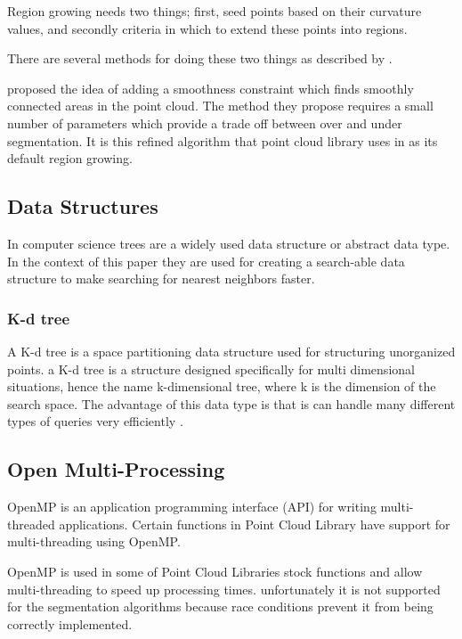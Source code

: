 			Region growing needs two things; first, seed points based on their curvature values, and secondly criteria in which to extend these points into regions.
			
			There are several methods for doing these two things as described by \cite{hoover_experimental_1996}.		
			
			\cite{rabbani_segmentation_2006} proposed the idea of adding a smoothness constraint which finds smoothly connected areas in the point cloud. The method they propose requires a small number of parameters which provide a trade off between over and under segmentation. It is this refined algorithm that point cloud library uses in as its default region growing.
			
			
	\subsection{Data Structures}
		In computer science trees are a widely used data structure or abstract data type. In the context of this paper they are used for creating a search-able data structure to make searching for nearest neighbors faster.
		
		\subsubsection{K-d tree}
			A K-d tree is a space partitioning data structure used for structuring unorganized points. a K-d tree is a structure designed specifically for multi dimensional situations, hence the name k-dimensional tree, where k is the dimension of the search space. The advantage of this data type is that is can handle many different types of queries very efficiently \citep{bentley_multidimensional_1975}.
			
			
			
	
			
			
			
			
	
	\subsection{Open Multi-Processing}
		OpenMP is an application programming interface (API) for writing multi-threaded applications. Certain functions in Point Cloud Library have support for multi-threading using OpenMP.
		
		OpenMP is used in some of Point Cloud Libraries stock functions and allow multi-threading to speed up processing times. unfortunately it is not supported for the segmentation algorithms because race conditions prevent it from being correctly implemented. 

		
		
		
		
		
		
		
		
		
		